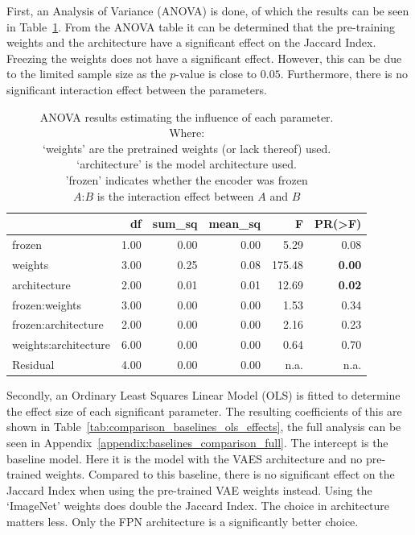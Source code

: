 First, an Analysis of Variance (ANOVA) is done, of which the results can be seen in Table~\ref{tab:comparison_baselines_anova_all}. From the ANOVA table it can be determined that the pre-training weights and the architecture have a significant effect on the Jaccard Index. Freezing the weights does not have a significant effect. However, this can be due to the limited sample size as the $p$-value is close to $0.05$. Furthermore, there is no significant interaction effect between the parameters. 
% 

\begin{table}[ht]
    \centering
    \caption{ANOVA results estimating the influence of each parameter.\\Where: \\\hphantom{tabb}`weights' are the pretrained weights (or lack thereof) used.\\\hphantom{tabb}`architecture' is the model architecture used.\\\hphantom{tabb}'frozen' indicates whether the encoder was frozen\\\hphantom{tabb}$A$:$B$ is the interaction effect between $A$ and $B$}
    \label{tab:comparison_baselines_anova_all}
    \begin{tabular}{lrrrrr}
        \toprule
                             & df   & sum\_sq & mean\_sq & F      & PR(>F)        \\
        \midrule
        frozen               & 1.00 & 0.00    & 0.00     & 5.29   & 0.08          \\
        weights              & 3.00 & 0.25    & 0.08     & 175.48 & \textbf{0.00} \\
        architecture         & 2.00 & 0.01    & 0.01     & 12.69  & \textbf{0.02} \\
        frozen:weights       & 3.00 & 0.00    & 0.00     & 1.53   & 0.34          \\
        frozen:architecture  & 2.00 & 0.00    & 0.00     & 2.16   & 0.23          \\
        weights:architecture & 6.00 & 0.00    & 0.00     & 0.64   & 0.70          \\
        Residual             & 4.00 & 0.00    & 0.00     & n.a.   & n.a.          \\
        \bottomrule
    \end{tabular}
\end{table}

Secondly, an Ordinary Least Squares Linear Model (OLS) is fitted to determine the effect size of each significant parameter. The resulting coefficients of this are shown in Table~\ref{tab:comparison_baselines_ols_effects}, the full analysis can be seen in Appendix~\ref{appendix:baselines_comparison_full}. The intercept is the baseline model. Here it is the model with the VAES architecture and no pre-trained weights. Compared to this baseline, there is no significant effect on the Jaccard Index when using the pre-trained VAE weights instead. Using the `ImageNet' weights does double the Jaccard Index. The choice in architecture matters less. Only the FPN architecture is a significantly better choice. 

